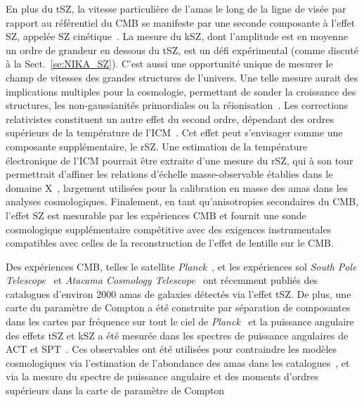 En plus du tSZ, la vitesse particulière de l'amas le long
de la ligne de visée par rapport au référentiel du CMB se manifeste
par une seconde composante à l'effet SZ, appelée SZ
cinétique~\citep[kSZ;][]{Sunyaev1980}. La mesure du kSZ, dont
l'amplitude est en moyenne un ordre de grandeur en dessous du tSZ, est
un défi expérimental (comme discuté à la
Sect.~\ref{se:NIKA_SZ}). C'est aussi une opportunité unique de mesurer
le champ de vitesses des grandes structures de l'univers. Une telle
mesure aurait des implications multiples pour la cosmologie,
permettant de sonder la croissance des
structures, les non-gaussianités primordiales ou la
réionisation~\citep[voir][par exemple]{SO2019}. 
Les corrections relativistes constituent un autre effet du second
ordre, dépendant des ordres supérieurs de la température de
l'ICM~\citep[voir \emph{e.\,g.}][]{Chluba2012}. Cet effet peut s'envisager comme une composante
supplémentaire, le rSZ. Une estimation de la
température électronique de l'ICM pourrait être
extraite d'une mesure du rSZ, qui à son tour permettrait d'affiner les
relations d'échelle masse-observable établies dans le domaine
X~\citep[voir \emph{e.\,g.}][]{Pratt2009}, largement utilisées pour la
calibration en masse des amas dans les analyses cosmologiques. Finalement, en tant
qu'anisotropies secondaires du CMB, l'effet SZ est mesurable par les
expériences CMB et fournit une sonde cosmologique supplémentaire
compétitive avec des exigences instrumentales compatibles avec celles
de la reconstruction de l'effet de lentille sur le CMB. 

Des expériences CMB, telles le satellite \emph{Planck}~\citep{Planck2016_SZcat}, et les
expériences sol \emph{South Pole Telescope}~\citep[SPT;][]{Bleem2015, Bleem2019}
et \emph{Atacama Cosmology Telescope}~\citep[ACT;][]{Hasselfield2013_ACT_SZ} ont récemment
publiés des catalogues d'environ 2000 amas de galaxies détectés via
l'effet tSZ. De plus, une carte du paramètre de Compton a été
construite par séparation de composantes dans les cartes par fréquence
sur tout le ciel de \emph{Planck}~\citep{Planck2016_ymap} et la
puissance angulaire des effets tSZ et kSZ a été mesurée dans les
spectres de puissance angulaires de ACT et
SPT~\citep[\emph{e.g.}]{Dunkley2013, George2015}.
Ces observables ont été utilisées pour contraindre les modèles
cosmologiques via l'estimation de l'abondance des amas dans les
catalogues~\citep{Planck_2016_SZ_cosmo, Hasselfield2013_ACT_SZ,
deHaan2016, Bocquet2019, Zulbedia2019}, et via la mesure du spectre de puissance
angulaire et des moments d'ordres supérieurs dans la carte de
paramètre de Compton~\citep{Planck2016_ymap, Hurier2017, Bolliet2018, Bolliet2019,
Salvati2018} 



